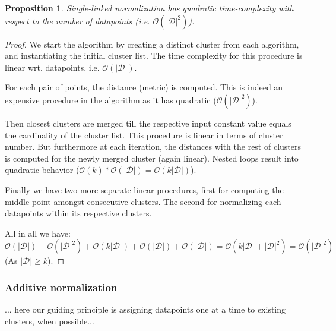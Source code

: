 \documentclass{article}
\newtheorem{proposition}{Proposition}
\newcommand{\dataset}{\mathcal{D}}   %
\begin{document}
\begin{proposition}
Single-linked normalization has quadratic time-complexity with respect to the number of datapoints (i.e. $\mathcal{O}(|\dataset|^2)$).
\end{proposition}

\begin{proof}
We start the algorithm by creating a distinct cluster from each algorithm, and instantiating the initial cluster list. The time complexity for this procedure is linear wrt. datapoints, i.e.  $\mathcal{O}(|\dataset|)$.

For each pair of points, the distance (metric) is computed. This is indeed an expensive procedure in the algorithm as it has quadratic ($\mathcal{O}(|\dataset|^2)$).

Then closest clusters are merged till the respective input constant value equals the cardinality of the cluster list. This procedure is linear in terms of cluster number. But furthermore at each iteration, the distances with the rest of clusters is computed for the newly merged cluster (again linear). Nested loops result into quadratic behavior  ($\mathcal{O}(k) * \mathcal{O}(|\dataset|) = \mathcal{O}(k|\dataset|)$).

Finally we have two more separate linear procedures, first for computing the middle point amongst consecutive clusters. The second for normalizing each datapoints within its respective clusters.

All in all we have:  $\mathcal{O}(|\dataset|) + \mathcal{O}(|\dataset|^2)  + \mathcal{O}(k|\dataset|)  + \mathcal{O}(|\dataset|) + \mathcal{O}(|\dataset|) =  \mathcal{O}(k|\dataset| + |\dataset|^2) = \mathcal{O}(|\dataset|^2) $  (As $|\dataset| \geq k$).

\end{proof}

\subsubsection{Additive normalization}


... here our guiding principle is assigning datapoints one at a time to existing clusters, when possible...
\end{document}

